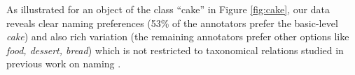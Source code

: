 As illustrated for an object of the class ``cake'' in Figure \ref{fig:cake}, our data reveals clear naming preferences (53\% of the annotators prefer the basic-level \textit{cake}) and also rich variation (the remaining annotators prefer other options like \textit{food, dessert, bread}) which is not restricted to taxonomical relations studied in previous work on naming \cite{rosch1976basic,Ordonez:2016,graf2016animal}.

